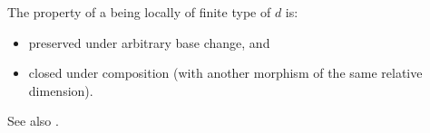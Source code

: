 \begin{proposition} \label{proposition:relative_dimension_morphism_of_schemes_stable_under_base_change_and_composition}
    The property of a  being locally of finite type of  $d$ is:
    \begin{itemize}
        \item preserved under arbitrary base change, and
        \item closed under composition (with another morphism of the same relative dimension).
    \end{itemize}

    See also .
\end{proposition}
